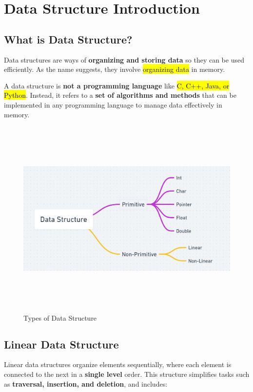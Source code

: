 \chapter{Data Structure Introduction}

\section*{\Large \textbf{What is Data Structure?}}
Data structures are ways of \textbf{organizing and storing data} so they can be used efficiently. As the name suggests, they involve \hl{organizing data} in memory.

A data structure is \textbf{not a programming language} like \hl{C, C++, Java, or Python}. Instead, it refers to a \textbf{set of algorithms and methods} that can be implemented in any programming language to manage data effectively in memory.

\begin{figure}[!ht]
  \centering
  \includegraphics[width=1\textwidth, height=10cm]{images/types.png}
  \caption{Types of Data Structure}
  \label{fig:ds_types}
\end{figure}

\newpage
\section*{\Large \textbf{Linear Data Structure}}
Linear data structures organize elements sequentially, where each element is connected to the next in a \textbf{single level} order. This structure simplifies tasks such as \textbf{traversal, insertion, and deletion}, and includes:

